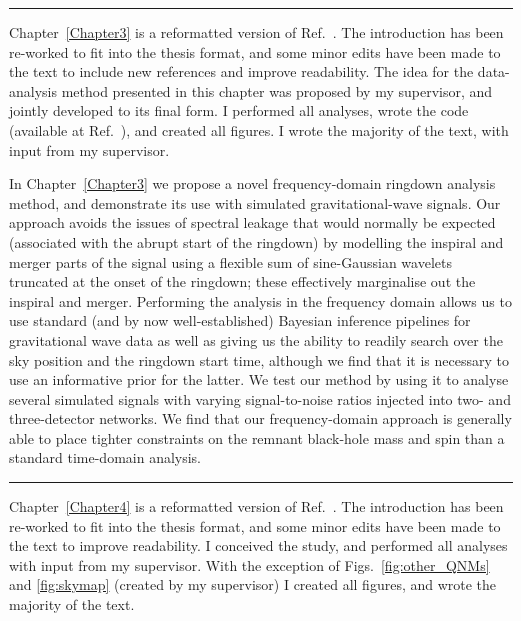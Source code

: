 \documentclass[
12pt, %
english, %
doublespacing, %
headsepline, %
]{MastersDoctoralThesis} %
\begin{document}
\begin{center}
    \rule[.5ex]{.5\textwidth}{.5pt}
\end{center}

\noindent Chapter~\ref{Chapter3} is a reformatted version of Ref.~\cite{Finch:2021qph}. 
The introduction has been re-worked to fit into the thesis format, and some minor edits have been made to the text to include new references and improve readability. 
The idea for the data-analysis method presented in this chapter was proposed by my supervisor, and jointly developed to its final form.
I performed all analyses, wrote the code (available at Ref.~\cite{fdringdown}), and created all figures. 
I wrote the majority of the text, with input from my supervisor.

\vspace{0.2cm}

\noindent In Chapter~\ref{Chapter3} we propose a novel frequency-domain ringdown analysis method, and demonstrate its use with simulated gravitational-wave signals.
Our approach avoids the issues of spectral leakage that would normally be expected (associated with the abrupt start of the ringdown) by modelling the inspiral and merger parts of the signal using a flexible sum of sine-Gaussian wavelets truncated at the onset of the ringdown; these effectively marginalise out the inspiral and merger.
Performing the analysis in the frequency domain allows us to use standard (and by now well-established) Bayesian inference pipelines for gravitational wave data as well as giving us the ability to readily search over the sky position and the ringdown start time, although we find that it is necessary to use an informative prior for the latter. 
We test our method by using it to analyse several simulated signals with varying signal-to-noise ratios injected into two- and three-detector networks. 
We find that our frequency-domain approach is generally able to place tighter constraints on the remnant black-hole mass and spin than a standard time-domain analysis.

\begin{center}
    \rule[.5ex]{.5\textwidth}{.5pt}
\end{center}

\noindent Chapter~\ref{Chapter4} is a reformatted version of Ref.~\cite{Finch:2022ynt}. 
The introduction has been re-worked to fit into the thesis format, and some minor edits have been made to the text to improve readability. 
I conceived the study, and performed all analyses with input from my supervisor.
With the exception of Figs.~\ref{fig:other_QNMs} and \ref{fig:skymap} (created by my supervisor) I created all figures, and wrote the majority of the text.
\end{document}
